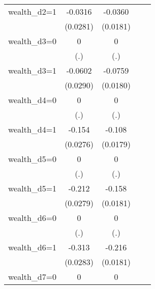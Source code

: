 \begin{table}[htbp]
\begin{tabular}{l*{4}{c}}
wealth\_d2=1     &  -0.0316         &  -0.0360\sym{**} &                  &                  \\
                & (0.0281)         & (0.0181)         &                  &                  \\
\addlinespace
wealth\_d3=0     &        0         &        0         &                  &                  \\
                &      (.)         &      (.)         &                  &                  \\
\addlinespace
wealth\_d3=1     &  -0.0602\sym{**} &  -0.0759\sym{***}&                  &                  \\
                & (0.0290)         & (0.0180)         &                  &                  \\
\addlinespace
wealth\_d4=0     &        0         &        0         &                  &                  \\
                &      (.)         &      (.)         &                  &                  \\
\addlinespace
wealth\_d4=1     &   -0.154\sym{***}&   -0.108\sym{***}&                  &                  \\
                & (0.0276)         & (0.0179)         &                  &                  \\
\addlinespace
wealth\_d5=0     &        0         &        0         &                  &                  \\
                &      (.)         &      (.)         &                  &                  \\
\addlinespace
wealth\_d5=1     &   -0.212\sym{***}&   -0.158\sym{***}&                  &                  \\
                & (0.0279)         & (0.0181)         &                  &                  \\
\addlinespace
wealth\_d6=0     &        0         &        0         &                  &                  \\
                &      (.)         &      (.)         &                  &                  \\
\addlinespace
wealth\_d6=1     &   -0.313\sym{***}&   -0.216\sym{***}&                  &                  \\
                & (0.0283)         & (0.0181)         &                  &                  \\
\addlinespace
wealth\_d7=0     &        0         &        0         &                  &                  \\

\end{tabular}
\end{table}
